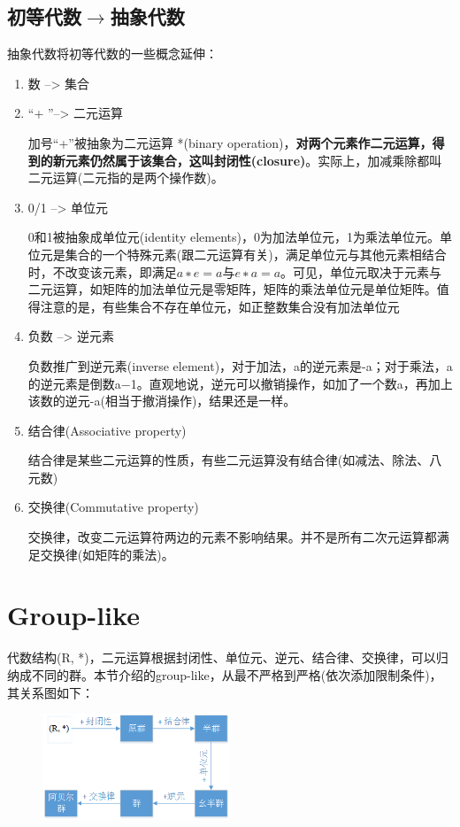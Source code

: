 \documentclass[12pt]{article}
\begin{document}
\subsection{初等代数$\rightarrow$抽象代数}
抽象代数将初等代数的一些概念延伸：
\begin{enumerate}[itemindent=0.5em]
\setlength{\itemsep}{0pt}
\setlength{\parsep}{0pt}
\setlength{\parskip}{0pt}
	\item 数 –> 集合
	
	\item “+ ”–> 二元运算
	
	加号“+”被抽象为二元运算 *(binary operation)，\textbf{对两个元素作二元运算，得到的新元素仍然属于该集合，这叫封闭性(closure)}。实际上，加减乘除都叫二元运算(二元指的是两个操作数)。
	
	\item 0/1 –> 单位元
	
	0和1被抽象成单位元(identity elements)，0为加法单位元，1为乘法单位元。单位元是集合的一个特殊元素(跟二元运算有关)，满足单位元与其他元素相结合时，不改变该元素，即满足$a ∗ e = a $与$e ∗ a = a$。可见，单位元取决于元素与二元运算，如矩阵的加法单位元是零矩阵，矩阵的乘法单位元是单位矩阵。值得注意的是，有些集合不存在单位元，如正整数集合没有加法单位元
	
	\item 负数 –> 逆元素
	
	负数推广到逆元素(inverse element)，对于加法，a的逆元素是-a；对于乘法，a的逆元素是倒数a−1。直观地说，逆元可以撤销操作，如加了一个数a，再加上该数的逆元-a(相当于撤消操作)，结果还是一样。
	
	\item 结合律(Associative property)
	
	结合律是某些二元运算的性质，有些二元运算没有结合律(如减法、除法、八元数)
	
	\item 交换律(Commutative property)
	
	交换律，改变二元运算符两边的元素不影响结果。并不是所有二次元运算都满足交换律(如矩阵的乘法)。
\end{enumerate}

\section{Group-like}
代数结构(R, *)，二元运算根据封闭性、单位元、逆元、结合律、交换律，可以归纳成不同的群。本节介绍的group-like，从最不严格到严格(依次添加限制条件)，其关系图如下：
\begin{figure}[H]
    \centering
    \includegraphics[width=0.5\textwidth]{fig/GroupLikeRelations.png}
\end{figure}
\end{document}
